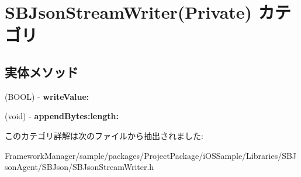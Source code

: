 \hypertarget{category_s_b_json_stream_writer_07_private_08}{}\section{S\+B\+Json\+Stream\+Writer(Private) カテゴリ}
\label{category_s_b_json_stream_writer_07_private_08}
\subsection*{実体メソッド}
\begin{DoxyCompactItemize}
\item 
\hypertarget{category_s_b_json_stream_writer_07_private_08_ad07ba844e4c471660daf9b5dfcb43e8e}{}(B\+O\+O\+L) -\/ {\bfseries write\+Value\+:}\label{category_s_b_json_stream_writer_07_private_08_ad07ba844e4c471660daf9b5dfcb43e8e}

\item 
\hypertarget{category_s_b_json_stream_writer_07_private_08_a27c7af220a32b2dedd15106e435a7df9}{}(void) -\/ {\bfseries append\+Bytes\+:length\+:}\label{category_s_b_json_stream_writer_07_private_08_a27c7af220a32b2dedd15106e435a7df9}

\end{DoxyCompactItemize}


このカテゴリ詳解は次のファイルから抽出されました\+:\begin{DoxyCompactItemize}
\item 
Framework\+Manager/sample/packages/\+Project\+Package/i\+O\+S\+Sample/\+Libraries/\+S\+B\+Json\+Agent/\+S\+B\+Json/S\+B\+Json\+Stream\+Writer.\+h\end{DoxyCompactItemize}
